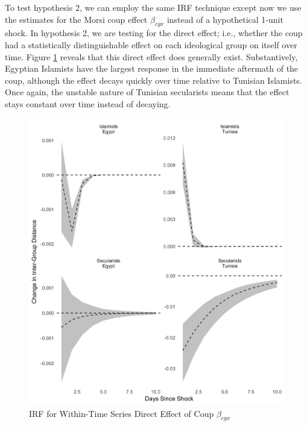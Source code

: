 \documentclass[12pt]{article}
\begin{document}
To test hypothesis 2, we can employ the same IRF technique except now we use the estimates for the Morsi coup effect $\beta_{cgx}$ instead of a hypothetical 1-unit shock. In hypothesis 2, we are testing for the direct effect; i.e., whether the coup had a statistically distinguishable effect on each ideological group on itself over time. Figure \ref{within_betax} reveals that this direct effect does generally exist. Substantively, Egyptian Islamists have the largest response in the immediate aftermath of the coup, although the effect decays quickly over time relative to Tunisian Islamists. Once again, the unstable nature of Tunisian secularists means that the effect stays constant over time instead of decaying. 
 \begin{figure}[!h]
	\centering
	\caption{IRF for Within-Time Series Direct Effect of Coup $\beta_{cgx}$}\label{within_betax}
	\centering
	\includegraphics[width=.9\linewidth]{irf_betax_within}
\end{figure}
\end{document}
